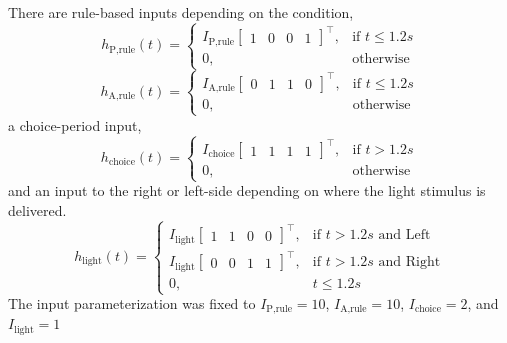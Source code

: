 \documentclass[11pt]{article}
\begin{document}
There are rule-based inputs depending on the condition,
\begin{equation}h_{\text{P,rule}}(t) = \begin{cases}
                           I_{\text{P,rule}} \begin{bmatrix} 1 & 0 & 0 & 1 \end{bmatrix}^\top,& \text{if } t\leq 1.2s \\
                            0,              & \text{otherwise}
                         \end{cases}
\end{equation}
\begin{equation} h_{\text{A,rule}}(t) = \begin{cases}
                           I_{\text{A,rule}} \begin{bmatrix} 0 & 1 & 1 & 0 \end{bmatrix}^\top,& \text{if } t\leq 1.2s \\
                            0,              & \text{otherwise}
                         \end{cases}
\end{equation}
a choice-period input,
\begin{equation} h_{\text{choice}}(t) = \begin{cases}
                           I_{\text{choice}} \begin{bmatrix} 1 & 1 & 1 & 1 \end{bmatrix}^\top,& \text{if } t > 1.2s \\
                            0,              & \text{otherwise}
                         \end{cases}
\end{equation}
and an input to the right or left-side depending on where the light stimulus is delivered.     
\begin{equation}  h_{\text{light}}(t) = \begin{cases}
                           I_{\text{light}} \begin{bmatrix} 1 & 1 & 0 & 0 \end{bmatrix}^\top,& \text{if } t > 1.2s \text{ and Left} \\
                           I_{\text{light}} \begin{bmatrix} 0 & 0 & 1 & 1 \end{bmatrix}^\top,& \text{if } t > 1.2s \text{ and Right} \\
                            0,              & t \leq 1.2s
                         \end{cases} 
\end{equation}
The input parameterization was fixed to $I_{\text{P,rule}} = 10 $,  $I_{\text{A,rule}} = 10$,  $I_{\text{choice}} = 2$,  and $I_{\text{light}} = 1$
\end{document}
